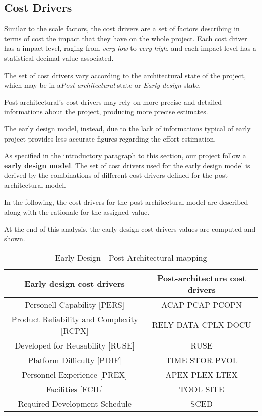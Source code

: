 \subsection{Cost Drivers}

Similar to the scale factors, the cost drivers are a set of factors describing in terms of cost the impact that they have on the whole project.
Each cost driver has a impact level, raging from \textit{very low} to \textit{very high}, and each impact level has a statistical decimal value associated.

The set of cost drivers vary according to the architectural state of the project, which may be in a\textit{Post-architectural} state or \textit{Early design} state.

Post-architectural's cost drivers may rely on more precise and detailed informations about the project, producing more precise estimates.

The early design model, instead, due to the lack of informations typical of early project provides less accurate figures regarding the effort estimation.

As specified in the introductory paragraph to this section, our project follow a \textbf{early design model}.
The set of cost drivers used for the early design model is derived by the combinations of different cost drivers defined for the post-architectural model.

In the following, the cost drivers for the post-architectural model are described along with the rationale for the assigned value.

At the end of this analysis, the early design cost drivers values are computed and shown.

\begin{table}[h!]
	\centering
	\begin{tabular}{|c|c|}
		\hline
		\textbf{Early design cost drivers} & \textbf{Post-architecture cost drivers} \\
		\hline
		Personell Capability [PERS] & ACAP PCAP PCOPN \\
		Product Reliability and Complexity [RCPX] & RELY DATA CPLX DOCU \\
		Developed for Reusability [RUSE] & RUSE \\ 
		Platform Difficulty [PDIF] & TIME STOR PVOL \\
		Personnel Experience [PREX] & APEX PLEX LTEX \\
		Facilities [FCIL] & TOOL SITE \\
		Required Development Schedule & SCED \\
		\hline
	\end{tabular}
	\caption{Early Design - Post-Architectural mapping}
	\label{table:ED2PA}
\end{table}

